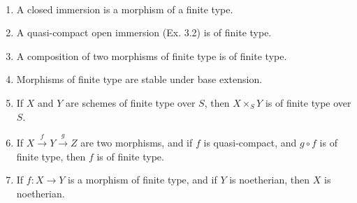 \begin{exercise}
	~
	\begin{enumerate}
		\item A closed immersion is a morphism of a finite type.
		\item A quasi-compact open immersion (Ex. 3.2) is of finite type.
		\item A composition of two morphisms of finite type is of finite type.
		\item Morphisms of finite type are stable under base extension.
		\item If $X $ and $Y $ are schemes of finite type over $S $, then $X \times_S Y $ is of finite type over $S $.
		\item If $X \xrightarrow{f} Y \xrightarrow{g} Z $ are two morphisms, and if $f $ is quasi-compact, and $g\circ f $ is of finite type, then $f $ is of finite type.
		\item If $f: X\to Y $ is a morphism of finite type, and if $Y $ is noetherian, then $X $ is noetherian.
	\end{enumerate}
\end{exercise}
